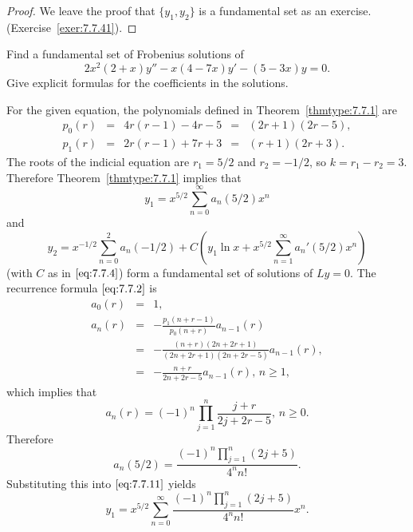 \documentclass{ximera}
\begin{document}
\begin{proof}
We leave the proof that $\{y_1,y_2\}$ is a fundamental set as an
exercise.(Exercise~\ref{exer:7.7.41}).
\end{proof}

\begin{example}\label{example:7.7.1}
Find a fundamental set of Frobenius  solutions of
$$
2x^2(2+x)y''-x(4-7x)y'-(5-3x)y=0.
$$
Give explicit  formulas for the coefficients in the solutions.

\begin{explanation}
For  the given equation, the polynomials defined in
Theorem~\ref{thmtype:7.7.1} are
$$
\begin{array}{ccccc}
p_0(r)&=&4r(r-1)-4r-5&=&(2r+1)(2r-5),\\
p_1(r)&=&2r(r-1)+7r+3&=&(r+1)(2r+3).
\end{array}
$$
The roots of the indicial equation are $r_1=5/2$ and $r_2=-1/2$,
so $k=r_1-r_2=3$. Therefore Theorem~\ref{thmtype:7.7.1} implies that
\begin{equation} \label{eq:7.7.11}
y_1=x^{5/2}\sum_{n=0}^\infty a_n(5/2)x^n
\end{equation}
and
\begin{equation} \label{eq:7.7.12}
y_2=x^{-1/2}\sum_{n=0}^2a_n(-1/2)+C\left(y_1\ln
x+x^{5/2}\sum_{n=1}^\infty a_n'(5/2)x^n\right)
\end{equation}
(with $C$ as in $\eqref{eq:7.7.4}$)
form a fundamental set of solutions of $Ly=0$. The recurrence
formula $\eqref{eq:7.7.2}$ is
\begin{equation} \label{eq:7.7.13}
\begin{array}{ccl}
a_0(r)&=&1,\\
a_n(r)&=&-\frac{p_1(n+r-1)}{p_0(n+r)}a_{n-1}(r)\\
&=&-\frac{(n+r)(2n+2r+1)}{(2n+2r+1)(2n+2r-5)}a_{n-1}(r),\\
&=&-\frac{n+r}{2n+2r-5}a_{n-1}(r),\,n\geq 1,
\end{array}
\end{equation}
which implies that
\begin{equation} \label{eq:7.7.14}
a_n(r)=(-1)^n\prod_{j=1}^n\frac{j+r}{2j+2r-5},\,n\geq 0.
\end{equation}
Therefore
\begin{equation} \label{eq:7.7.15}
a_n(5/2)=\frac{(-1)^n\prod_{j=1}^n(2j+5)}{4^nn!}.
\end{equation}
Substituting this into $\eqref{eq:7.7.11}$ yields
$$
y_1=x^{5/2}\sum_{n=0}^\infty\frac{(-1)^n\prod_{j=1}^n(2j+5)}{4^nn!}x^n.
$$


\end{explanation}
\end{example}
\end{document}
